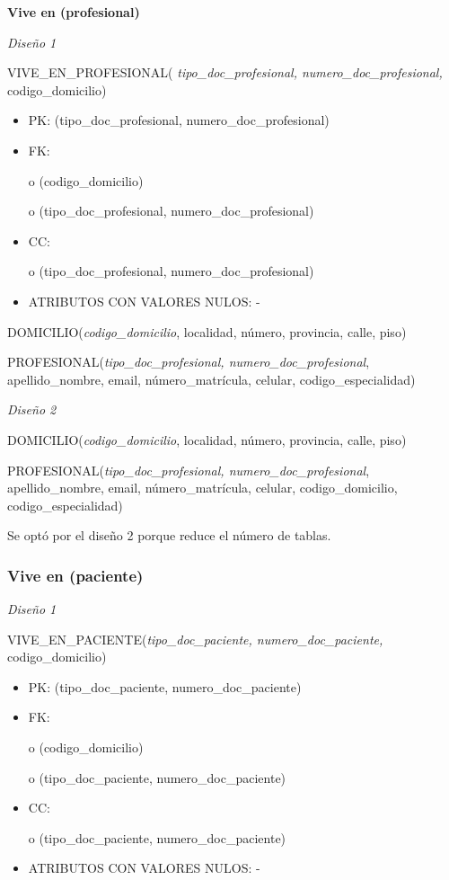 \documentclass[a4paper,11pt]{article}
\begin{document}
\textbf{Vive en (profesional)}

\textit{Diseño 1}

VIVE\_EN\_PROFESIONAL(\emph{ tipo\_doc\_profesional, numero\_doc\_profesional, 
}codigo\_domicilio)

\begin{itemize}
\item PK: (tipo\_doc\_profesional, numero\_doc\_profesional)

\item FK: 

o (codigo\_domicilio)

o (tipo\_doc\_profesional, numero\_doc\_profesional)

\item CC:

o (tipo\_doc\_profesional, numero\_doc\_profesional)

\item ATRIBUTOS CON VALORES NULOS: -
\end{itemize}

DOMICILIO(\emph{codigo\_domicilio}, localidad, número, provincia, calle, piso)

PROFESIONAL(\emph{tipo\_doc\_profesional, numero\_doc\_profesional}, apellido\_nombre, 
email, número\_matrícula, celular, codigo\_especialidad)

\textit{Diseño 2}

DOMICILIO(\emph{codigo\_domicilio}, localidad, número, provincia, calle, piso)

PROFESIONAL(\emph{tipo\_doc\_profesional, numero\_doc\_profesional}, apellido\_nombre, 
email, número\_matrícula, celular,\textit{\textbf{ }}codigo\_domicilio, codigo\_especialidad)

Se optó por el diseño 2 porque reduce el número de tablas.\label{HToc293405843}

\subsubsection{\textbf{Vive en (paciente)}}

\textit{Diseño 1}

VIVE\_EN\_PACIENTE(\emph{tipo\_doc\_paciente, numero\_doc\_paciente,} codigo\_domicilio)

\begin{itemize}
\item PK: (tipo\_doc\_paciente, numero\_doc\_paciente)

\item FK: 

o (codigo\_domicilio)

o (tipo\_doc\_paciente, numero\_doc\_paciente)

\item CC:

o (tipo\_doc\_paciente, numero\_doc\_paciente)

\item ATRIBUTOS CON VALORES NULOS: -
\end{itemize}
\end{document}

